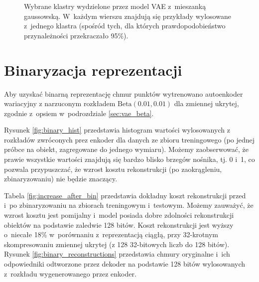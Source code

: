 \documentclass{iithesis}
\begin{document}
\begin{figure}
    \caption{\label{fig:clustering} Wybrane klastry wydzielone przez model VAE z~mieszanką gaussowską.
    W~każdym wierszu znajdują się przykłady wylosowane z~jednego klastra (spośród tych, dla których
    prawdopodobieństwo przynależności przekraczało 95\%).}
\end{figure}

\section{Binaryzacja reprezentacji}
Aby uzyskać binarną reprezentację chmur punktów wytrenowano autoenkoder wariacyjny
z narzuconym rozkładem $\text{Beta}(0.01, 0.01)$ dla zmiennej ukrytej,
zgodnie z~opsiem w~podrozdziale \ref{sec:vae_beta}.

Rysunek \ref{fig:binary_hist} przedstawia histogram wartości wylosowanych
z rozkładów zwróconych prez enkoder dla danych ze zbioru treningowego
(po jednej próbce na obiekt, zagregowane do jednego wymiaru). Możemy zaobserwować,
że prawie wszystkie wartości znajdują się bardzo blisko brzegów nośnika, tj. 0 i~1,
co pozwala przypuszczać, że wzrost kosztu rekonstrukcji (po zaokrągleniu, zbinaryzowaniu) nie będzie znaczący.

Tabela \ref{fig:increase_after_bin} przedstawia dokładny koszt rekonstrukcji
przed i~po zbinaryzowaniu na zbiorach treningowym i~testowym. Możemy zauważyć, że wzrost kosztu
jest pomijalny i~model posiada dobre zdolności rekonstrukcji obiektów na podstawie zaledwie 128 bitów.
Koszt rekonstrukcji jest wyższy o~niecałe 18\% w~porównaniu z~reprezentacją ciągłą, przy 32-krotnym skompresowaniu
zmiennej ukrytej (z 128 32-bitowych liczb do 128 bitów).
Rysunek \ref{fig:binary_reconstructions} przedstawia chmury oryginalne i~ich odpowiedniki
odtworzone przez dekoder na podstawie 128 bitów wylosowanych z~rozkładu wygenerowanego przez enkoder.
\end{document}
